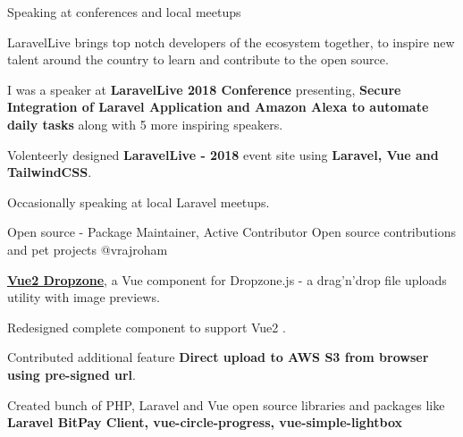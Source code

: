 

\begin{cventries}

  \cventry
    { } %
    {Speaking at conferences and local meetups} %
    { } %
    { } %
    {
      \begin{cvitems} %
        \item {LaravelLive brings top notch developers of the ecosystem together, to inspire new talent around the country to learn and contribute to the open source.}
        \item {I was a speaker at \textbf{LaravelLive 2018 Conference}  presenting, \textbf{Secure Integration of Laravel Application and Amazon Alexa to automate daily tasks} along with 5 more inspiring speakers.}
        \item {Volenteerly designed \textbf{LaravelLive - 2018} event site  using \textbf{Laravel, Vue and TailwindCSS}.}
        \item {Occasionally speaking at local Laravel meetups.}
      \end{cvitems}
    }
  \cventry
    {Open source - Package Maintainer, Active Contributor} %
    {Open source contributions and pet projects} %
    {@vrajroham} %
    { } %
    {
      \begin{cvitems} %
        \item { \textbf{\href{https://github.com/rowanwins/vue-dropzone}{Vue2 Dropzone}}, a Vue component for Dropzone.js - a drag’n’drop file uploads utility with image previews.}
        \item {Redesigned complete component to support Vue2 .}
        \item {Contributed additional feature \textbf{Direct upload to AWS S3 from browser using pre-signed url}.}
        \item {Created bunch of PHP, Laravel and Vue open source libraries and packages like \textbf{Laravel BitPay Client, vue-circle-progress, vue-simple-lightbox
}}
\end{cvitems}}
\end{cventries}
